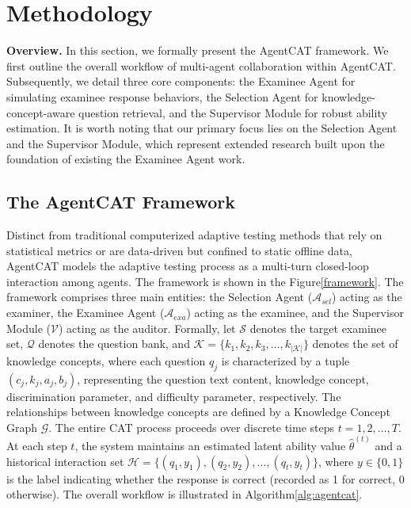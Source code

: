 

\section{Methodology}

\textbf{Overview.} In this section, we formally present the AgentCAT framework. We first outline the overall workflow of multi-agent collaboration within AgentCAT. Subsequently, we detail three core components: the Examinee Agent for simulating examinee response behaviors, the Selection Agent for knowledge-concept-aware question retrieval, and the Supervisor Module for robust ability estimation. It is worth noting that our primary focus lies on the Selection Agent and the Supervisor Module, which represent extended research built upon the foundation of existing the Examinee Agent work.


\subsection{The AgentCAT Framework}
Distinct from traditional computerized adaptive testing methods that rely on statistical metrics or are data-driven but confined to static offline data, AgentCAT models the adaptive testing process as a multi-turn closed-loop interaction among agents. The framework is shown in the Figure\ref{framework}. The framework comprises three main entities: the Selection Agent ($\mathcal{A}_{sel}$) acting as the examiner, the Examinee Agent ($\mathcal{A}_{exa}$) acting as the examinee, and the Supervisor Module ($\mathcal{V}$) acting as the auditor. Formally, let $\mathcal{S}$ denotes the target examinee set, $\mathcal{Q} $ denotes the question bank, and $\mathcal{K} = \{k_1, k_2, k_3, \dots, k_{|\mathcal{K}|}\}$ denotes the set of knowledge concepts, where each question $q_j$ is characterized by a tuple $(c_j, k_j, a_j, b_j)$, representing the question text content, knowledge concept, discrimination parameter, and difficulty parameter, respectively. The relationships between knowledge concepts are defined by a Knowledge Concept Graph $\mathcal{G}$. The entire CAT process proceeds over discrete time steps $t=1, 2, \dots, T$. At each step $t$, the system maintains an estimated latent ability value $\hat{\theta}^{(t)}$ and a historical interaction set $\mathcal{H} = \{(q_1, y_1), (q_2, y_2), \dots, (q_t, y_t)\}$, where $y \in \{0, 1\}$ is the label indicating whether the response is correct (recorded as 1 for correct, 0 otherwise). The overall workflow is illustrated in Algorithm\ref{alg:agentcat}. 




